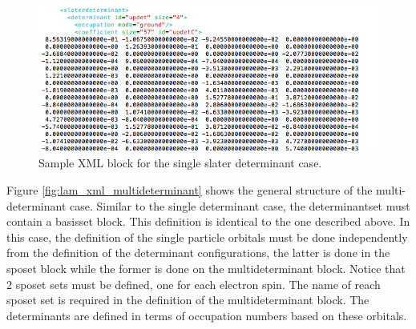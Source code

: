 \begin{figure}[ht!]
\begin{center}
\includegraphics[trim = 0mm 0mm 0mm 0mm, clip,width=1.0\columnwidth]{figures/lab_advanced_molecules_xml_slaterdeterminant.png}
\end{center}
\caption{Sample XML block for the single slater determinant case.}
\label{fig:lam_xml_slaterdeterminant}
\end{figure}

Figure \ref{fig:lam_xml_multideterminant} shows the general structure of the multi-determinant case. 
Similar to the
single determinant case, the determinantset must contain a basisset block. This definition is
identical to the one described above. In this case, the definition of the single particle orbitals
must be done independently from the definition of the determinant configurations, the latter
is done in the sposet block while the former is done on the multideterminant block. Notice
that 2 sposet sets must be defined, one for each electron spin. The name of reach sposet set
is required in the definition of the multideterminant block. The determinants are defined in
terms of occupation numbers based on these orbitals.

